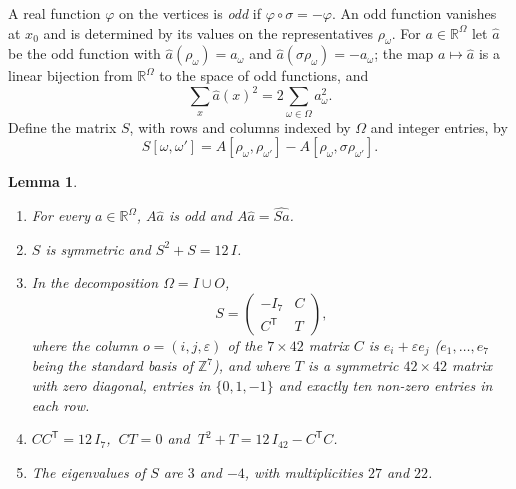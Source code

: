 \documentclass[11pt,a4paper]{article}
\newtheorem{lemma}[theorem]{Lemma}
\theoremstyle{definition}
\theoremstyle{remark}
\newcommand{\ZZ}{\mathbb{Z}}
\newcommand{\RR}{\mathbb{R}}
\newcommand{\tp}{\mathsf{T}}
\newcommand{\sg}{\sigma}
\newcommand{\Om}{\Omega}
\begin{document}
A real function $\varphi$ on the vertices is \emph{odd} if $\varphi\circ\sg=-\varphi$. An odd function vanishes at
$x_0$ and is determined by its values on the representatives $\rho_\omega$. For $a\in\RR^{\Om}$ let $\hat a$ be the
odd function with $\hat a(\rho_\omega)=a_\omega$ and $\hat a(\sg\rho_\omega)=-a_\omega$; the map $a\mapsto\hat a$ is
a linear bijection from $\RR^{\Om}$ to the space of odd functions, and
\begin{equation}\label{eq:norm2}
\sum_x\hat a(x)^2=2\sum_{\omega\in\Om}a_\omega^2 .
\end{equation}
Define the matrix $S$, with rows and columns indexed by $\Om$ and integer entries, by
\[
S[\omega,\omega']=A[\rho_\omega,\rho_{\omega'}]-A[\rho_\omega,\sg\rho_{\omega'}] .
\]

\begin{lemma}\label{lem:S}
\begin{enumerate}[label=\textup{(\alph*)}]
\item For every $a\in\RR^{\Om}$, $A\hat a$ is odd and $A\hat a=\widehat{Sa}$.
\item $S$ is symmetric and $S^2+S=12\,I$.
\item In the decomposition $\Om=I\cup O$,
\[
S=\begin{pmatrix}-I_7&C\\ C^{\tp}&T\end{pmatrix},
\]
where the column $o=(i,j,\varepsilon)$ of the $7\times42$ matrix $C$ is $e_i+\varepsilon e_j$ ($e_1,\dots,e_7$
being the standard basis of $\ZZ^7$), and where $T$ is a symmetric $42\times42$ matrix with zero diagonal, entries in
$\{0,1,-1\}$ and exactly ten non-zero entries in each row.
\item $CC^{\tp}=12\,I_7$, $\ CT=0$ and $\ T^2+T=12\,I_{42}-C^{\tp}C$.
\item The eigenvalues of $S$ are $3$ and $-4$, with multiplicities $27$ and $22$.
\end{enumerate}
\end{lemma}
\end{document}
